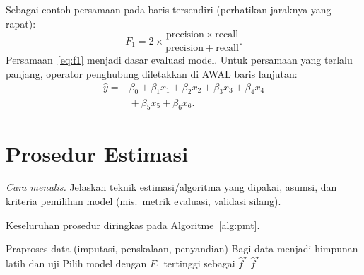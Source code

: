 Sebagai contoh persamaan pada baris tersendiri (perhatikan jaraknya yang rapat):
\begin{equation}\label{eq:f1}
F_1 = 2 \times \frac{\mathrm{precision}\times \mathrm{recall}}{\mathrm{precision}+\mathrm{recall}}.
\end{equation}
Persamaan~\ref{eq:f1} menjadi dasar evaluasi model. Untuk persamaan yang terlalu
panjang, operator penghubung diletakkan di AWAL baris lanjutan:
\begin{equation}\label{eq:model}
\begin{aligned}
\hat{y} ={}& \beta_0 + \beta_1 x_1 + \beta_2 x_2 + \beta_3 x_3 + \beta_4 x_4 \\
         &{}+ \beta_5 x_5 + \beta_6 x_6 .
\end{aligned}
\end{equation}

\section{Prosedur Estimasi}
\emph{Cara menulis.} Jelaskan teknik estimasi/algoritma yang dipakai, asumsi, dan kriteria pemilihan model (mis.\ metrik evaluasi, validasi silang).

Keseluruhan prosedur diringkas pada Algoritme~\ref{alg:pmt}.

\begin{algorithm}[H]
\caption{Estimasi dan evaluasi model PMT}\label{alg:pmt}
Praproses data (imputasi, penskalaan, penyandian)\;
Bagi data menjadi himpunan latih dan uji\;
Pilih model dengan $F_1$ tertinggi sebagai $\hat{f}^\star$\;
\KwRet $\hat{f}^\star$\;
\end{algorithm}

